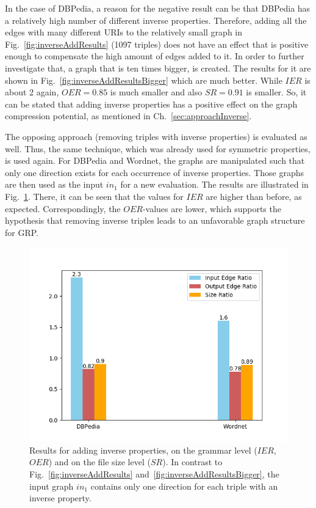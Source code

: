In the case of DBPedia, a reason for the negative result can be that DBPedia has a relatively high number of different inverse properties. Therefore, adding all the edges with many different URIs to the relatively small graph in Fig.~\ref{fig:inverseAddResults} (1097 triples) does not have an effect that is positive enough to compensate the high amount of edges added to it. In order to further investigate that, a graph that is ten times bigger, is created. The results for it are shown in Fig.~\ref{fig:inverseAddResultsBigger} which are much better. While $IER$ is about 2 again, $OER=0.85$ is much smaller and also $SR=0.91$ is smaller. So, it can be stated that adding inverse properties has a positive effect on the graph compression potential, as mentioned in Ch.~\ref{sec:approachInverse}.




\clearpage
The opposing approach (removing triples with inverse properties) is evaluated as well. Thus, the same technique, which was already used for symmetric properties, is used again. For DBPedia and Wordnet, the graphs are manipulated such that only one direction exists for each occurrence of inverse properties. Those graphs are then used as the input $in_1$ for a new evaluation. The results are illustrated in Fig.~\ref{fig:inverseAddResults2}. There, it can be seen that the values for $IER$ are higher than before, as expected. Correspondingly, the $OER$-values are lower, which supports the hypothesis that removing inverse triples leads to an unfavorable graph structure for GRP.


\begin{figure}
	\centering
	\includegraphics[width=0.8\linewidth]{figures/4_evaluation/ontology/ratiosInverseAdd2}
	\caption{Results for adding inverse properties, on the grammar level ($IER$, $OER$) and on the file size level ($SR$). In contrast to Fig.~\ref{fig:inverseAddResults} and~\ref{fig:inverseAddResultsBigger}, the input graph $in_1$ contains only one direction for each triple with an inverse property.}
	\label{fig:inverseAddResults2}
\end{figure}

